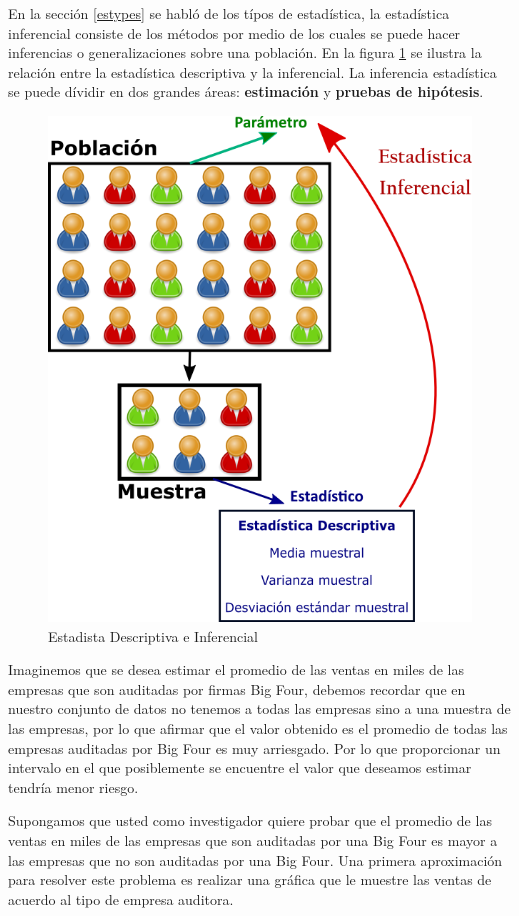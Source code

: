 \documentclass[letterpaper,]{book}
\begin{document}
En la sección \ref{estypes} se habló de los típos de estadística, la estadística inferencial consiste de los métodos por medio de los cuales se puede hacer inferencias o generalizaciones sobre una población. En la figura \ref{fig:infedesc} se ilustra la relación entre la estadística descriptiva y la inferencial. La inferencia estadística se puede dívidir en dos grandes áreas: \textbf{estimación} y \textbf{pruebas de hipótesis}.

\begin{figure}[h!]

{\centering \includegraphics[width=0.55\linewidth]{infedesc} 

}

\caption{Estadista Descriptiva e Inferencial}\label{fig:infedesc}
\end{figure}

Imaginemos que se desea estimar el promedio de las ventas en miles de las empresas que son auditadas por firmas Big Four, debemos recordar que en nuestro conjunto de datos no tenemos a todas las empresas sino a una muestra de las empresas, por lo que afirmar que el valor obtenido es el promedio de todas las empresas auditadas por Big Four es muy arriesgado. Por lo que proporcionar un intervalo en el que posiblemente se encuentre el valor que deseamos estimar tendría menor riesgo.

Supongamos que usted como investigador quiere probar que el promedio de las ventas en miles de las empresas que son auditadas por una Big Four es mayor a las empresas que no son auditadas por una Big Four. Una primera aproximación para resolver este problema es realizar una gráfica que le muestre las ventas de acuerdo al tipo de empresa auditora.
\end{document}
